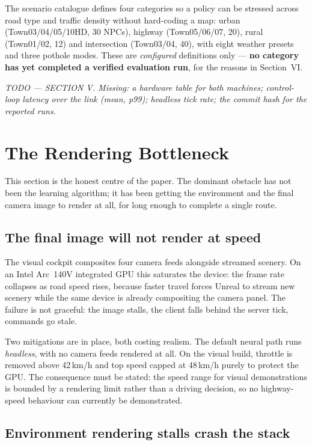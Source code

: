 \documentclass[conference]{IEEEtran}
\newcommand{\TODO}[1]{%
  \begingroup
  \setlength{\FrameSep}{4pt}%
  \def\FrameCommand{{\color{gray!55}\vrule width 1.2pt}\hspace{5pt}}%
  \MakeFramed{\advance\hsize-\width \FrameRestore}%
  \noindent\scriptsize\itshape\color{gray!80}#1%
  \endMakeFramed
  \endgroup}
\begin{document}
The scenario catalogue defines four categories so a policy can be
stressed across road type and traffic density without hard-coding a map:
urban (Town03/04/05/10HD, 30 NPCs), highway (Town05/06/07, 20), rural
(Town01/02, 12) and intersection (Town03/04, 40), with eight weather
presets and three pothole modes. These are \emph{configured} definitions
only --- \textbf{no category has yet completed a verified evaluation
run}, for the reasons in Section~VI.

\TODO{TODO --- SECTION V. Missing: a hardware table for both machines;
control-loop latency over the link (mean, p99); headless tick rate; the
commit hash for the reported runs.}

\section{The Rendering Bottleneck}

This section is the honest centre of the paper. The dominant obstacle
has not been the learning algorithm; it has been getting the environment
and the final camera image to render at all, for long enough to complete
a single route.

\subsection{The final image will not render at speed}

The visual cockpit composites four camera feeds alongside streamed
scenery. On an Intel Arc~140V integrated GPU this saturates the device:
the frame rate collapses as road speed rises, because faster travel
forces Unreal to stream new scenery while the same device is already
compositing the camera panel. The failure is not graceful: the image
stalls, the client falls behind the server tick, commands go stale.

Two mitigations are in place, both costing realism. The default neural
path runs \emph{headless}, with no camera feeds rendered at all. On the
visual build, throttle is removed above 42\,km/h and top speed capped at
48\,km/h purely to protect the GPU. The consequence must be stated: the
speed range for visual demonstrations is bounded by a rendering limit
rather than a driving decision, so no highway-speed behaviour can
currently be demonstrated.

\subsection{Environment rendering stalls crash the stack}
\end{document}
